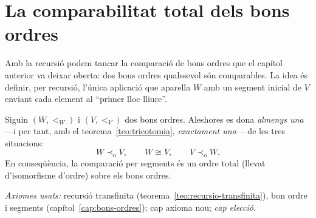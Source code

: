 \section{La comparabilitat total dels bons ordres}\label{sec:comparabilitat}

Amb la recursió podem tancar la comparació de bons ordres que el capítol
anterior va deixar oberta: dos bons ordres qualssevol són comparables. La
idea és definir, per recursió, l'única aplicació que aparella \(W\) amb un
segment inicial de \(V\) enviant cada element al \enquote{primer lloc lliure}.

\begin{teorema}\label{teo:comparabilitat}
Siguin \((W,<_W)\) i \((V,<_V)\) dos bons ordres. Aleshores es dona
\emph{almenys una} ---i per tant, amb el teorema~\ref{teo:tricotomia},
\emph{exactament una}--- de les tres situacions:
\[
W\prec_{\mathrm o}V,
\qquad
W\cong V,
\qquad
V\prec_{\mathrm o}W .
\]
En conseqüència, la comparació per segments és un ordre total (llevat
d'isomorfisme d'ordre) sobre els bons ordres.\par
\emph{Axiomes usats:} recursió transfinita
(teorema~\ref{teo:recursio-transfinita}), bon ordre i segments
(capítol~\ref{cap:bons-ordres}); cap axioma nou; \emph{cap elecció}.
\end{teorema}

